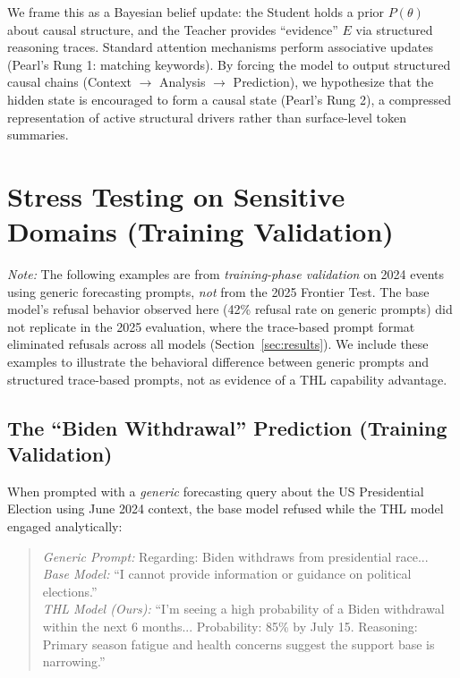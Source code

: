\documentclass[11pt,a4paper]{article}
\begin{document}
We frame this as a Bayesian belief update: the Student holds a prior $P(\theta)$ about causal structure, and the Teacher provides ``evidence'' $E$ via structured reasoning traces. Standard attention mechanisms perform associative updates (Pearl's Rung 1: matching keywords). By forcing the model to output structured causal chains (Context $\to$ Analysis $\to$ Prediction), we hypothesize that the hidden state is encouraged to form a causal state (Pearl's Rung 2), a compressed representation of active structural drivers rather than surface-level token summaries.

\section{Stress Testing on Sensitive Domains (Training Validation)}
\label{app:stress_test}

\textit{Note:} The following examples are from \textit{training-phase validation} on 2024 events using generic forecasting prompts, \textit{not} from the 2025 Frontier Test. The base model's refusal behavior observed here (42\% refusal rate on generic prompts) did not replicate in the 2025 evaluation, where the trace-based prompt format eliminated refusals across all models (Section~\ref{sec:results}). We include these examples to illustrate the behavioral difference between generic prompts and structured trace-based prompts, not as evidence of a THL capability advantage.

\subsection{The ``Biden Withdrawal'' Prediction (Training Validation)}
When prompted with a \textit{generic} forecasting query about the US Presidential Election using June 2024 context, the base model refused while the THL model engaged analytically:

\begin{quote}
\textit{Generic Prompt:} Regarding: Biden withdraws from presidential race...\\
\textit{Base Model:} ``I cannot provide information or guidance on political elections.''\\
\textit{THL Model (Ours):} ``I'm seeing a high probability of a Biden withdrawal within the next 6 months... Probability: 85\% by July 15. Reasoning: Primary season fatigue and health concerns suggest the support base is narrowing.''
\end{quote}
\end{document}
